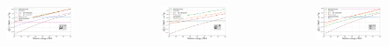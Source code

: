 \begin{frame}{}
\begin{minipage}[t][1cm][t]{\textwidth}
  \vspace{-10pt}
  \begin{columns}[t]
    \begin{figure}
      \includegraphics[width=\linewidth, height=.4\textheight, keepaspectratio]{plots/muon_dEdx.png}
    \end{figure}
    \vspace{-10pt}
    \begin{figure}
      \includegraphics[width=\linewidth, height=.4\textheight, keepaspectratio]{plots/positron_dEdx.png}
    \end{figure}
    \vspace{-10pt}
    \begin{figure}
      \includegraphics[width=\linewidth, height=.4\textheight, keepaspectratio]{plots/tau_dEdx.png}

\end{figure}
\end{columns}
\end{minipage}
\end{frame}
